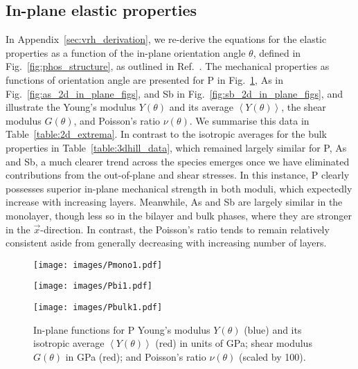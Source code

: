 \subsection{In-plane elastic properties}
\label{sec:in_plane_elastic_props}

In Appendix~\ref{sec:vrh_derivation}, 
we re-derive the 
equations for the elastic properties as a 
function of the in-plane orientation angle $\theta$, 
defined in Fig.~\ref{fig:phos_structure}, 
as outlined in Ref.~\cite{jones1975mechanics}.
%
The mechanical properties 
as functions of orientation angle 
are presented 
for P in Fig.~\ref{fig:p_2d_in_plane_figs}, 
As in Fig.~\ref{fig:as_2d_in_plane_figs},
and Sb in Fig.~\ref{fig:sb_2d_in_plane_figs}, 
and  illustrate   
the Young's modulus $Y\left(\theta\right)$ 
and its average $\left<Y\left(\theta\right)\right>$,
the shear modulus $G\left(\theta\right)$,
and Poisson's ratio $\nu\left(\theta\right)$.
%
We summarise this data 
in Table~\ref{table:2d_extrema}.
%
In contrast to the isotropic averages for 
the bulk properties in Table~\ref{table:3dhill_data}, 
which remained largely similar for P, As and Sb, 
a much clearer trend across the species emerges 
once we have eliminated contributions from 
the out-of-plane and shear stresses.
%
In this instance, P clearly possesses superior 
in-plane mechanical strength in both moduli, 
which expectedly increase with increasing layers.
%
Meanwhile, As and Sb are largely similar in the monolayer, 
though less so in the bilayer and bulk phases, 
where they are stronger in the $\vec{x}$-direction.
%
In contrast,  
the Poisson's ratio tends to remain relatively consistent 
aside from generally decreasing with increasing 
number of layers.

\begin{figure}[th!]
\begin{subfloat}[Monolayer P]{
\texttt{[image: images/Pmono1.pdf]}
  \label{fig:pmono1}}
\end{subfloat}
%
\begin{subfloat}[Bilayer P]{
\texttt{[image: images/Pbi1.pdf]}
  \label{fig:pbi1}}
\end{subfloat}
%
\begin{subfloat}[Bulk P]{
\texttt{[image: images/Pbulk1.pdf]}
  \label{fig:pbulk1}}
\end{subfloat}
%
\caption[Phosphorus in-plane mechanical properties]{
In-plane functions for P  
Young's modulus $Y\left(\theta\right)$ (blue)
and its isotropic average $\left<Y\left(\theta\right)\right>$ 
(red) in units of GPa; 
shear modulus $G\left(\theta\right)$ in GPa (red);
and Poisson's ratio $\nu\left(\theta\right)$ 
(scaled by 100).
}
\label{fig:p_2d_in_plane_figs}
\end{figure}


